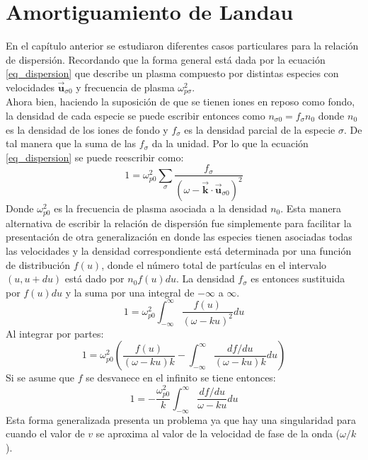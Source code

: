 \documentclass[../tesis_main_file.tex]{subfiles}
\begin{document}
\section{Amortiguamiento de Landau}
En el capítulo anterior se estudiaron diferentes casos particulares para la relación de dispersión. Recordando que la forma general está dada por la ecuación \ref{eq_dispersion} que describe un plasma compuesto por distintas especies con velocidades $\overrightarrow{\textbf{u}}_{\sigma 0}$ y frecuencia de plasma $\omega^2_{p \sigma}$.\\
Ahora bien, haciendo la suposición de que se tienen iones en reposo como fondo, la densidad de cada especie se puede escribir entonces como $n_{\sigma 0} = f_{\sigma}n_0$ donde $n_0$ es la densidad de los iones de fondo y $f_{\sigma}$ es la densidad parcial de la especie $\sigma$. De tal manera que la suma de las $f_{\sigma}$ da la unidad. Por lo que la ecuación \ref{eq_dispersion} se puede reescribir como:
\begin{equation}
\label{eq:dispersion_general_1}
1 =\omega^2_{p0}\sum_{\sigma}\frac{f_{\sigma}}{(\omega - \overrightarrow{\textbf{k}}\cdot \overrightarrow{\textbf{u}}_{\sigma 0})^2}
\end{equation}
Donde $\omega^2_{p0}$ es la frecuencia de plasma asociada a la densidad $n_0$. Esta manera alternativa de escribir la relación de dispersión fue simplemente para facilitar la presentación de otra generalización en donde las especies tienen asociadas todas las velocidades y la densidad correspondiente está determinada por una función de distribución $f(u)$, donde el número total de partículas en el intervalo $(u,u+du)$ está dado por $n_0f(u)du$. La densidad $f_{\sigma}$ es entonces sustituida por $f(u)du$ y la suma por una integral de $-\infty$ a $\infty$.
\begin{equation}
\label{eq:dispersion_general_2}
1= \omega^2_{p0}\int^{\infty}_{-\infty}\frac{f(u)}{(\omega-k u)^2}du
\end{equation}
Al integrar por partes:
\begin{equation}
1=\omega^2_{p0}\left(\frac{f(u)}{(\omega - ku)k}- \int^{\infty}_{-\infty}\frac{df/du}{(\omega -k u)k}du \right)
\end{equation}
Si se asume que $f$ se desvanece en el infinito se tiene entonces:
\begin{equation}
1=-\frac{\omega^2_{p0}}{k}\int^{\infty}_{-\infty}\frac{df/du}{\omega -k u}du
\end{equation}
Esta forma generalizada presenta un problema ya que hay una singularidad para cuando el valor de $v$ se aproxima al valor de la velocidad de fase de la onda ($\omega/k$).\\
\end{document}
